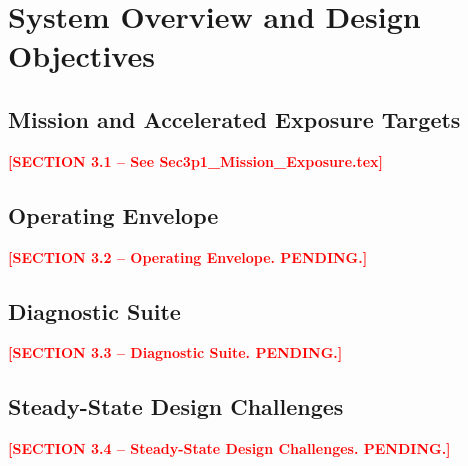 \documentclass[]{interact}
\newcommand{\INSERT}[1]{\textcolor{red}{\textbf{[#1]}}}
\begin{document}
\section{System Overview and Design Objectives}
\label{sec:system}

\subsection{Mission and Accelerated Exposure Targets}
\label{sec:mission}

\INSERT{SECTION 3.1 -- See Sec3p1\_Mission\_Exposure.tex}

\subsection{Operating Envelope}
\label{sec:operating_envelope}

\INSERT{SECTION 3.2 -- Operating Envelope. PENDING.}

\subsection{Diagnostic Suite}
\label{sec:diagnostics}

\INSERT{SECTION 3.3 -- Diagnostic Suite. PENDING.}

\subsection{Steady-State Design Challenges}
\label{sec:design_challenges}

\INSERT{SECTION 3.4 -- Steady-State Design Challenges. PENDING.}
\end{document}
